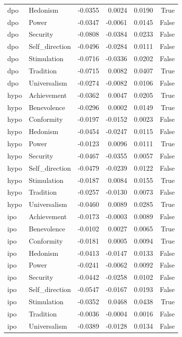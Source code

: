 \begin{tabular}{llrrrr}
dpo & Hedonism & -0.0355 & 0.0024 & 0.0190 & True \\
dpo & Power & -0.0347 & -0.0061 & 0.0145 & False \\
dpo & Security & -0.0808 & -0.0384 & 0.0233 & False \\
dpo & Self\_direction & -0.0496 & -0.0284 & 0.0111 & False \\
dpo & Stimulation & -0.0716 & -0.0336 & 0.0202 & False \\
dpo & Tradition & -0.0715 & 0.0082 & 0.0407 & True \\
dpo & Universalism & -0.0274 & -0.0082 & 0.0106 & False \\
hypo & Achievement & -0.0362 & 0.0047 & 0.0205 & True \\
hypo & Benevolence & -0.0296 & 0.0002 & 0.0149 & True \\
hypo & Conformity & -0.0197 & -0.0152 & 0.0023 & False \\
hypo & Hedonism & -0.0454 & -0.0247 & 0.0115 & False \\
hypo & Power & -0.0123 & 0.0096 & 0.0111 & True \\
hypo & Security & -0.0467 & -0.0355 & 0.0057 & False \\
hypo & Self\_direction & -0.0479 & -0.0239 & 0.0122 & False \\
hypo & Stimulation & -0.0187 & 0.0084 & 0.0155 & True \\
hypo & Tradition & -0.0257 & -0.0130 & 0.0073 & False \\
hypo & Universalism & -0.0460 & 0.0089 & 0.0285 & True \\
ipo & Achievement & -0.0173 & -0.0003 & 0.0089 & False \\
ipo & Benevolence & -0.0102 & 0.0027 & 0.0065 & True \\
ipo & Conformity & -0.0181 & 0.0005 & 0.0094 & True \\
ipo & Hedonism & -0.0413 & -0.0147 & 0.0133 & False \\
ipo & Power & -0.0241 & -0.0062 & 0.0092 & False \\
ipo & Security & -0.0442 & -0.0258 & 0.0102 & False \\
ipo & Self\_direction & -0.0547 & -0.0167 & 0.0193 & False \\
ipo & Stimulation & -0.0352 & 0.0468 & 0.0438 & True \\
ipo & Tradition & -0.0036 & -0.0004 & 0.0016 & False \\
ipo & Universalism & -0.0389 & -0.0128 & 0.0134 & False \\

\end{tabular}
